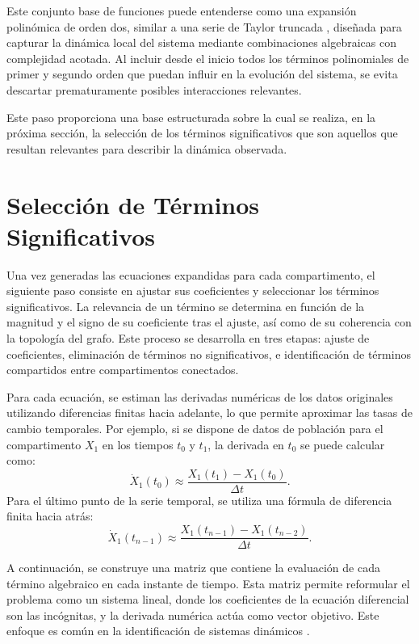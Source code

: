 Este conjunto base de funciones puede entenderse como una expansión polinómica de orden dos, similar a una serie de Taylor truncada \cite{ArfkenWeberHarris2012}, 
diseñada para capturar la dinámica local del sistema mediante combinaciones algebraicas con complejidad acotada. Al incluir desde el inicio todos los términos 
polinomiales de primer y segundo orden que puedan influir en la evolución del sistema, se evita descartar prematuramente posibles interacciones relevantes.

Este paso proporciona una base estructurada sobre la cual se realiza, en la próxima sección, la selección de los términos significativos que son aquellos que 
resultan relevantes para describir la dinámica observada.

\section{Selección de Términos Significativos}
\label{sec:term_sig}

Una vez generadas las ecuaciones expandidas para cada compartimento, el siguiente paso consiste en ajustar sus coeficientes y seleccionar los términos significativos. 
La relevancia de un término se determina en función de la magnitud y el signo de su coeficiente tras el ajuste, así como de su coherencia con la topología del grafo. 
Este proceso se desarrolla en tres etapas: ajuste de coeficientes, eliminación de términos no significativos, e identificación de términos compartidos entre 
compartimentos conectados.

Para cada ecuación, se estiman las derivadas numéricas de los datos originales utilizando diferencias finitas hacia adelante, lo que permite aproximar las 
tasas de cambio temporales. Por ejemplo, si se dispone de datos de población para el compartimento \(X_1\) 
en los tiempos \(t_0\) y \(t_1\), la derivada en \(t_0\) se puede calcular como:
\[
\dot{X}_1(t_0) \approx \frac{X_1(t_1) - X_1(t_0)}{\Delta t}.
\]
Para el último punto de la serie temporal, se utiliza una fórmula de diferencia finita hacia atrás:
\[
\dot{X}_1(t_{n-1}) \approx \frac{X_1(t_{n-1}) - X_1(t_{n-2})}{\Delta t}.
\]

A continuación, se construye una matriz que contiene la evaluación de cada término algebraico en cada instante de tiempo. Esta matriz permite reformular el 
problema como un sistema lineal, donde los coeficientes de la ecuación diferencial son las incógnitas, y la derivada numérica actúa como vector objetivo. 
Este enfoque es común en la identificación de sistemas dinámicos \cite{ljung1999, Billings2013}.

